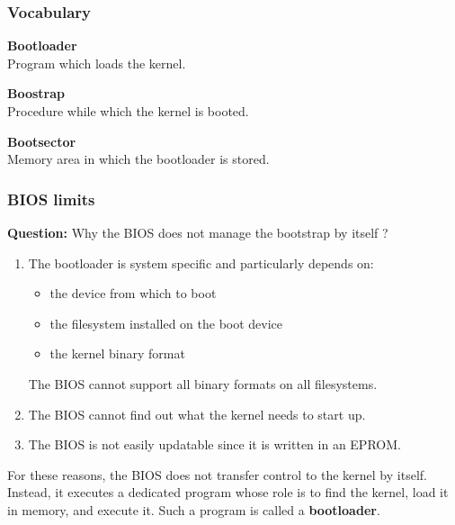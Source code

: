 %
%
%

\begin{frame}
  \frametitle{Vocabulary}

  \begin{description}
  \item {\bf Bootloader}\\
  Program which loads the kernel.

  \nl

  \item {\bf Boostrap}\\
  Procedure while which the kernel is booted.

  \nl

  \item {\bf Bootsector}\\
  Memory area in which the bootloader is stored.
  \end{description}

\end{frame}

%
%
%

\begin{frame}
  \frametitle{BIOS limits}

  {\bf Question:} Why the BIOS does not manage the bootstrap by itself ?

  \-

  \begin{enumerate}
  \item The bootloader is system specific and particularly depends on:

  \begin{itemize}
  \item the device from which to boot
  \item the filesystem installed on the boot device
  \item the kernel binary format
  \end{itemize}

  The BIOS cannot support all binary formats on all filesystems.

  \-

  \item The BIOS cannot find out what the kernel needs to start up.

  \-

  \item The BIOS is not easily updatable since it is written in an EPROM.

  \end{enumerate}

  \-

  For these reasons, the BIOS does not transfer control to the kernel by itself. Instead, it executes a dedicated program whose role is to find the kernel, load it in memory, and execute it. Such a program is called a {\bf bootloader}.



\end{frame}

